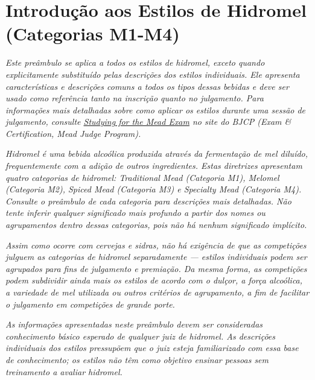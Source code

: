\section*{Introdução aos Estilos de Hidromel (Categorias M1-M4)}

\textit{Este preâmbulo se aplica a todos os estilos de hidromel, exceto quando explicitamente substituído pelas descrições dos estilos individuais. Ele apresenta características e descrições comuns a todos os tipos dessas bebidas e deve ser usado como referência tanto na inscrição quanto no julgamento. Para informações mais detalhadas sobre como aplicar os estilos durante uma sessão de julgamento, consulte \href{https://www.bjcp.org/exam-certification/mead-judge-program/mead-exam/}{Studying for the Mead Exam} no site do BJCP (Exam \& Certification, Mead Judge Program).}

\textit{Hidromel é uma bebida alcoólica produzida através da fermentação de mel diluído, frequentemente com a adição de outros ingredientes. Estas diretrizes apresentam quatro categorias de hidromel: Traditional Mead (Categoria M1), Melomel (Categoria M2), Spiced Mead (Categoria M3) e Specialty Mead (Categoria M4). Consulte o preâmbulo de cada categoria para descrições mais detalhadas. Não tente inferir qualquer significado mais profundo a partir dos nomes ou agrupamentos dentro dessas categorias, pois não há nenhum significado implícito.}

\textit{Assim como ocorre com cervejas e sidras, não há exigência de que as competições julguem as categorias de hidromel separadamente — estilos individuais podem ser agrupados para fins de julgamento e premiação. Da mesma forma, as competições podem subdividir ainda mais os estilos de acordo com o dulçor, a força alcoólica, a variedade de mel utilizada ou outros critérios de agrupamento, a fim de facilitar o julgamento em competições de grande porte.}

\textit{As informações apresentadas neste preâmbulo devem ser consideradas conhecimento básico esperado de qualquer juiz de hidromel. As descrições individuais dos estilos pressupõem que o juiz esteja familiarizado com essa base de conhecimento; os estilos não têm como objetivo ensinar pessoas sem treinamento a avaliar hidromel.}